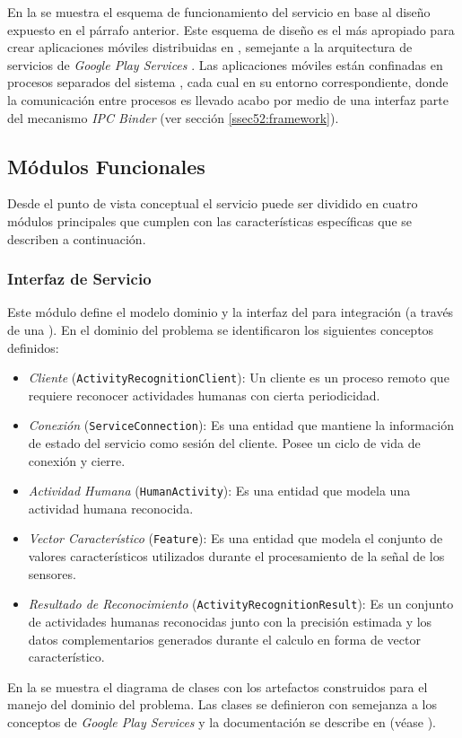 En la  se muestra el esquema de funcionamiento
del servicio  en base al diseño expuesto en el párrafo
anterior. Este esquema de diseño es el más apropiado para crear aplicaciones
móviles distribuidas en , semejante a la arquitectura
de servicios de \emph{Google Play Services} \cite{Google2016l}. Las
aplicaciones móviles están confinadas en procesos separados del sistema
, cada cual en su entorno  correspondiente,
donde la comunicación entre procesos es llevado acabo por medio de
una interfaz  parte del mecanismo \emph{IPC Binder} (ver
sección \ref{ssec52:framework}).

\subsection{Módulos Funcionales}

\label{ssec54:modulos}Desde el punto de vista conceptual el servicio
 puede ser dividido en cuatro módulos principales
que cumplen con las características específicas que se describen a
continuación.

\subsubsection{Interfaz de Servicio}

Este módulo define el modelo dominio y la interfaz del para integración
(a través de una ). En el dominio del problema se identificaron
los siguientes conceptos definidos:
\begin{itemize}
\item \emph{Cliente} (\texttt{\small{}ActivityRecognitionClient}): Un cliente
es un proceso remoto que requiere reconocer actividades humanas con
cierta periodicidad.
\item \emph{Conexión} (\texttt{\small{}ServiceConnection}):\emph{ }Es una
entidad que mantiene la información de estado del servicio como sesión
del cliente. Posee un ciclo de vida de conexión y cierre.
\item \emph{Actividad Humana} (\texttt{\small{}HumanActivity}): Es una entidad
que modela una actividad humana reconocida.
\item \emph{Vector Característico} (\texttt{\small{}Feature}): Es una entidad
que modela el conjunto de valores característicos utilizados durante
el procesamiento de la señal de los sensores.
\item \emph{Resultado de Reconocimiento} (\texttt{\small{}ActivityRecognitionResult}):
Es un conjunto de actividades humanas reconocidas junto con la precisión
estimada y los datos complementarios generados durante el calculo
en forma de vector característico.
\end{itemize}
En la  se muestra el diagrama de clases
con los artefactos construidos para el manejo del dominio del problema.
Las clases se definieron con semejanza a los conceptos de \emph{Google
Play Services} \cite{Google2016l} y la documentación se describe
en (véase \cite{GimenezYegros2016d}).

